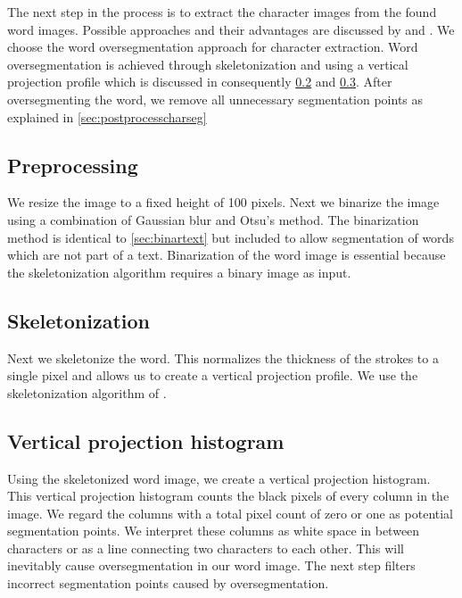 \documentclass{article}
\begin{document}
The next step in the process is to extract the character images from the found word images.
Possible approaches and their advantages are discussed by \cite{CharSegm} and \cite{CharSegmOld}.
We choose the word oversegmentation approach for character extraction. Word oversegmentation is achieved through skeletonization and using a vertical projection profile which is discussed in consequently \ref{sec:skel} and \ref{sec:vertproj}. 
After oversegmenting the word, we remove all unnecessary segmentation points as explained in \ref{sec:postprocesscharseg}

\subsection{Preprocessing}
We resize the image to a fixed height of 100 pixels. 
Next we binarize the image using a combination of Gaussian blur and Otsu's method. 
The binarization method is identical to \ref{sec:binartext} but included to allow segmentation of words which are not part of a text. Binarization of the word image is essential because the skeletonization algorithm requires a binary image as input.

\subsection{Skeletonization}
\label{sec:skel}
Next we skeletonize the word. This normalizes the thickness of the strokes to a single pixel and
allows us to create a vertical projection profile. We use the skeletonization algorithm of \cite{zsthinning}. 

\subsection{Vertical projection histogram}
\label{sec:vertproj}

Using the skeletonized word image, we create a vertical projection histogram.
This vertical projection histogram counts the black pixels of every column in the image.
We regard the columns with a total pixel count of zero or one as potential segmentation points.
We interpret these columns as white space in between characters or as a line connecting two characters to each other.
This will inevitably cause oversegmentation in our word image.
The next step filters incorrect segmentation points caused by oversegmentation. 
\end{document}
